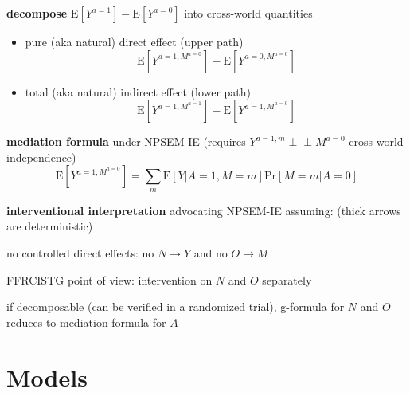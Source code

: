 \documentclass[8pt,twoside]{extarticle}
\newcommand{\indep}{\perp \!\!\! \perp}
\begin{document}
\begin{multicols}{2}
{\begin{minipage}{28em}
\textbf{decompose} $\mathrm{E}\left[Y^{a=1}\right]  - \mathrm{E}\left[Y^{a=0}\right]$ into cross-world quantities
\begin{itemize}[itemsep=0em, topsep=0pt, partopsep=0pt,parsep=0pt, leftmargin=1.5em]
\item pure (aka natural) direct effect (upper path) $$\mathrm{E}\left[Y^{a=1, M^{a=0}}\right]  - \mathrm{E}\left[Y^{a=0, M^{a=0}}\right]$$
\item total (aka natural) indirect effect (lower path) $$\mathrm{E}\left[Y^{a=1, M^{a=1}}\right]  - \mathrm{E}\left[Y^{a=1, M^{a=0}}\right]$$
\end{itemize}

\textbf{mediation formula} under NPSEM-IE (requires $Y^{a=1,m} \indep M^{a=0}$ cross-world independence)
$$\mathrm{E}\left[Y^{a=1,M^{a=0}}\right] = \sum_m \mathrm{E}\left[Y|A=1, M=m\right]\mathrm{Pr}\left[M=m|A=0\right] $$


\textbf{interventional interpretation} advocating NPSEM-IE assuming:
(thick arrows are deterministic)

no controlled direct effects: no $N\to Y$ and no $O\to M$

FFRCISTG point of view: intervention on $N$ and $O$ separately

if decomposable (can be verified in a randomized trial), g-formula for $N$ and $O$ reduces to mediation formula for $A$



\end{minipage}}

\end{multicols}





\section{Models}
\end{document}
